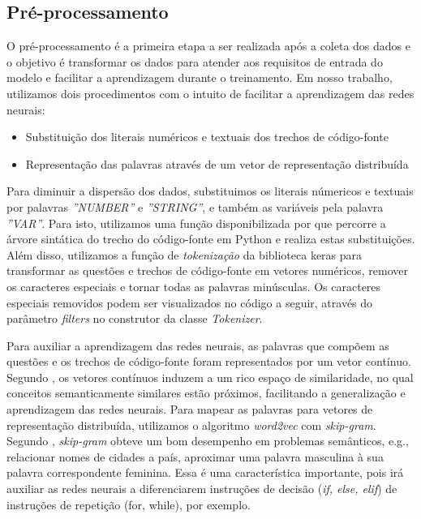 \subsection{Pré-processamento}
\label{sec:pre-processamento}

O pré-processamento é a primeira etapa a ser realizada após a coleta dos dados e o objetivo é transformar os dados para atender aos requisitos de entrada do modelo e facilitar a aprendizagem durante o treinamento. Em nosso trabalho, utilizamos dois procedimentos com o intuito de facilitar a aprendizagem das redes neurais:

\begin{itemize}
    \item Substituição dos literais numéricos e textuais dos trechos de código-fonte
    \item Representação das palavras através de um vetor de representação distribuída
\end{itemize}

Para diminuir a dispersão dos dados, substituimos os literais númericos e textuais por palavras \emph{''NUMBER''} e \emph{''STRING''}, e também as variáveis pela palavra \emph{''VAR''}. Para isto, utilizamos uma função disponibilizada por \cite{yao-2018} que percorre a árvore sintática do trecho do código-fonte em Python e realiza estas substituições. Além disso, utilizamos a função de \textit{tokenização} da biblioteca \Gls{keras} para transformar as questões e trechos de código-fonte em vetores numéricos, remover os caracteres especiais e tornar todas as palavras minúsculas. Os caracteres especiais removidos podem ser visualizados no código a seguir, através do parâmetro \textit{filters} no construtor da classe \textit{Tokenizer}.



Para auxiliar a aprendizagem das redes neurais, as palavras que compõem as questões e os trechos de código-fonte foram representados por um vetor contínuo. Segundo \cite{Goodfellow-et-al-2016}, os vetores contínuos induzem a um rico espaço de similaridade, no qual conceitos semanticamente similares estão próximos, facilitando a generalização e aprendizagem das redes neurais. Para mapear as palavras para vetores de representação distribuída, utilizamos o algoritmo \textit{word2vec} com \textit{skip-gram}. Segundo \cite{mikolov2013distributed}, \textit{skip-gram} obteve um bom desempenho em problemas semânticos, e.g., relacionar nomes de cidades a país, aproximar uma palavra masculina à sua palavra correspondente feminina. Essa é uma característica importante, pois irá auxiliar as redes neurais a diferenciarem instruções de decisão (\textit{if, else, elif}) de instruções de repetição (for, while), por exemplo. 

